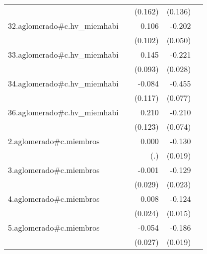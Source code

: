 {\begin{longtable}{l*{4}{D{.}{.}{-1}}}
            &                     &     (0.162)         &     (0.136)         &                     \\
\addlinespace
32.aglomerado#c.hv\_miemhabi&                     &       0.106         &      -0.202\sym{***}&                     \\
            &                     &     (0.102)         &     (0.050)         &                     \\
\addlinespace
33.aglomerado#c.hv\_miemhabi&                     &       0.145         &      -0.221\sym{***}&                     \\
            &                     &     (0.093)         &     (0.028)         &                     \\
\addlinespace
34.aglomerado#c.hv\_miemhabi&                     &      -0.084         &      -0.455\sym{***}&                     \\
            &                     &     (0.117)         &     (0.077)         &                     \\
\addlinespace
36.aglomerado#c.hv\_miemhabi&                     &       0.210         &      -0.210\sym{**} &                     \\
            &                     &     (0.123)         &     (0.074)         &                     \\
\addlinespace
2.aglomerado#c.miembros&                     &       0.000         &      -0.130\sym{***}&                     \\
            &                     &         (.)         &     (0.019)         &                     \\
\addlinespace
3.aglomerado#c.miembros&                     &      -0.001         &      -0.129\sym{***}&                     \\
            &                     &     (0.029)         &     (0.023)         &                     \\
\addlinespace
4.aglomerado#c.miembros&                     &       0.008         &      -0.124\sym{***}&                     \\
            &                     &     (0.024)         &     (0.015)         &                     \\
\addlinespace
5.aglomerado#c.miembros&                     &      -0.054\sym{*}  &      -0.186\sym{***}&                     \\
            &                     &     (0.027)         &     (0.019)         &                     \\

\end{longtable}}
